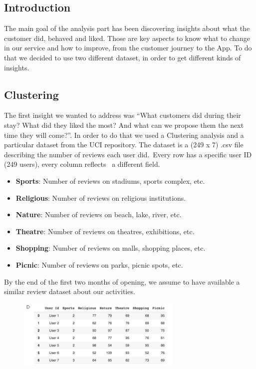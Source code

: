 \subsection{Introduction}
The main goal of the analysis part has been discovering insights about what the customer did, behaved and liked. Those are key aspects to know what to change in our service and how to improve, from the customer journey to the App. 
To do that we decided to use two different dataset, in order to get different kinds of insights.

\subsection{Clustering}
The first insight we wanted to address was “What customers did during their stay? What did they liked the most? And what can we propose them the next time they will come?”.
In order to do that we used a Clustering analysis and a particular dataset from the UCI repository. The dataset is a (249 x 7) .csv file describing the number of reviews each user did. Every row has a specific user ID (249 users), every column reflects  a different field.

\begin{itemize}
\item \textbf{Sports}: Number of reviews on stadiums, sports complex, etc.
\item \textbf{Religious}: Number of reviews on religious institutions.
\item \textbf{Nature}: Number of reviews on beach, lake, river, etc.
\item \textbf{Theatre}: Number of reviews on theatres, exhibitions, etc.
\item \textbf{Shopping}: Number of reviews on malls, shopping places, etc.
\item \textbf{Picnic}: Number of reviews on parks, picnic spots, etc.
\end{itemize}

By the end of the first two months of opening, we assume to have available a similar review dataset about our activities.

\begin{figure}[H]
\centering
\includegraphics[width=0.7\textwidth]{Img/Review_dataset.png}
\end{figure}

